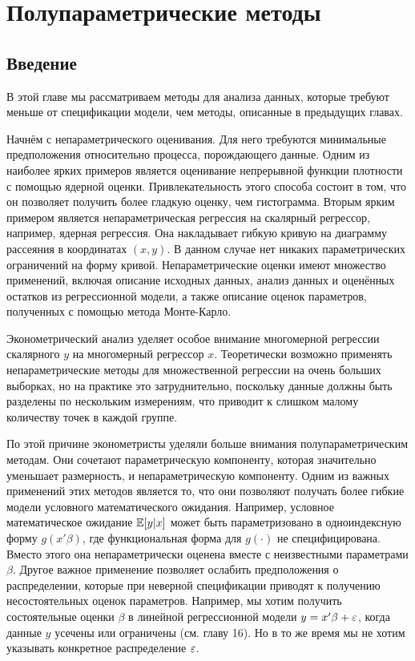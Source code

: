
\chapter{Полупараметрические методы}
\section{Введение}

В этой главе мы рассматриваем методы для анализа данных, которые требуют меньше от спецификации модели, чем методы, описанные в предыдущих главах.

Начнём с непараметрического оценивания. Для него требуются минимальные предположения относительно процесса, порождающего данные. Одним из наиболее ярких примеров является оценивание непрерывной функции плотности с помощью ядерной оценки. 
Привлекательность этого способа состоит в том, что он позволяет получить более гладкую оценку, чем гистограмма. Вторым ярким примером является непараметрическая регрессия на скалярный регрессор, например, ядерная регрессия. Она накладывает гибкую кривую на диаграмму рассеяния в координатах $(x,y)$. В данном случае нет никаких параметрических ограничений на форму кривой. Непараметрические оценки имеют множество применений, включая описание исходных данных, анализ данных и оценённых остатков из регрессионной модели, а также описание оценок параметров, полученных с помощью метода Монте-Карло.

Эконометрический анализ уделяет особое внимание многомерной регрессии скалярного $y$ на многомерный регрессор $x$. Теоретически возможно применять непараметрические методы для множественной регрессии на очень больших выборках, но на практике это затруднительно, поскольку данные должны быть разделены по нескольким измерениям, что приводит к слишком малому количеству точек в каждой группе.

По этой причине эконометристы уделяли больше внимания полупараметрическим методам. Они сочетают параметрическую компоненту, которая значительно уменьшает размерность, и непараметрическую компоненту. Одним из важных применений этих методов является то, что они позволяют получать более гибкие модели условного математического ожидания. Например, условное математическое ожидание $\mathbb{E}[y|x]$ может быть параметризовано в одноиндексную форму $g(x'\beta)$, где функциональная форма для $g(\cdot)$ не специфицирована. Вместо этого она непараметрически оценена вместе с неизвестными параметрами $\beta$. Другое важное применение позволяет ослабить предположения о распределении, которые при неверной спецификации приводят к получению несостоятельных оценок параметров. Например, мы хотим получить состоятельные оценки $\beta$ в линейной регрессионной модели $y = x'\beta + \varepsilon$, когда данные $y$ усечены или ограничены (см. главу 16). Но в то же время мы не хотим указывать конкретное распределение $\varepsilon$.

